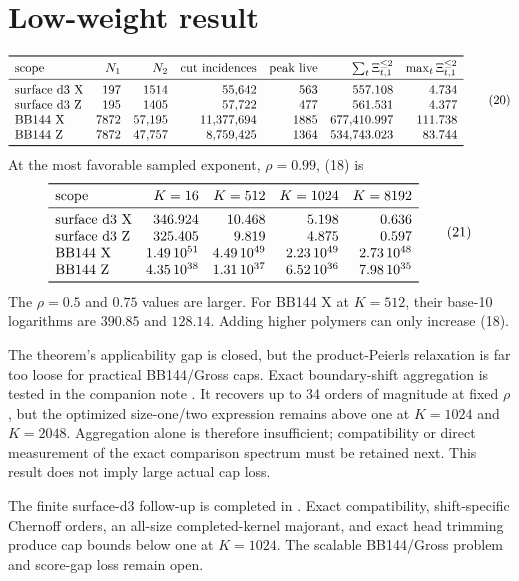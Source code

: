\documentclass[11pt]{article}
\newcommand{\1}{\mathbf 1}
\begin{document}
\section{Low-weight result}

\[
\begin{array}{lrrrrrr}
\toprule
\text{scope} & N_1 & N_2 & \text{cut incidences} & \text{peak live}
& \sum_t\Xi^{\le2}_{t,1} & \max_t\Xi^{\le2}_{t,1}\\
\midrule
\text{surface d3 X}&197&1514&55{,}642&563&557.108&4.734\\
\text{surface d3 Z}&195&1405&57{,}722&477&561.531&4.377\\
\text{BB144 X}&7872&57{,}195&11{,}377{,}694&1885&677{,}410.997&111.738\\
\text{BB144 Z}&7872&47{,}757&8{,}759{,}425&1364&534{,}743.023&83.744\\
\bottomrule
\end{array}
\tag{20}
\]
At the most favorable sampled exponent, \(\rho=0.99\), (18) is
\[
\begin{array}{lrrrr}
\toprule
\text{scope} & K=16 & K=512 & K=1024 & K=8192\\
\midrule
\text{surface d3 X}&346.924&10.468&5.198&0.636\\
\text{surface d3 Z}&325.405&9.819&4.875&0.597\\
\text{BB144 X}&1.49\,10^{51}&4.49\,10^{49}&2.23\,10^{49}&2.73\,10^{48}\\
\text{BB144 Z}&4.35\,10^{38}&1.31\,10^{37}&6.52\,10^{36}&7.98\,10^{35}\\
\bottomrule
\end{array}
\tag{21}
\]
The \(\rho=0.5\) and \(0.75\) values are larger.  For BB144 X at
\(K=512\), their base-10 logarithms are \(390.85\) and \(128.14\).
Adding higher polymers can only increase (18).

The theorem's applicability gap is closed, but the product-Peierls
relaxation is far too loose for practical BB144/Gross caps.  Exact
boundary-shift aggregation is tested in the companion note
\texttt{}.  It recovers up to 34
orders of magnitude at fixed \(\rho\), but the optimized size-one/two
expression remains above one at \(K=1024\) and \(K=2048\).  Aggregation alone
is therefore insufficient; compatibility or direct measurement of the exact
comparison spectrum must be retained next.  This result does not imply large
actual cap loss.

The finite surface-d3 follow-up is completed in
\texttt{}.  Exact compatibility,
shift-specific Chernoff orders, an all-size completed-kernel majorant, and
exact head trimming produce cap bounds below one at \(K=1024\).  The scalable
BB144/Gross problem and score-gap loss remain open.
\end{document}
